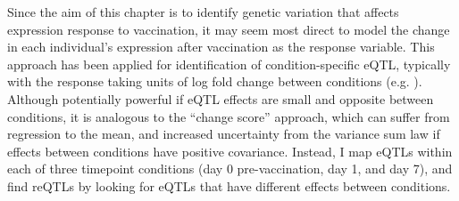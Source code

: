 Since the aim of this chapter is to identify genetic variation that affects expression response to vaccination, it may seem most direct to model the change in each individual's expression after vaccination as the response variable.
This approach has been applied for identification of condition-specific \gls{eQTL}, typically with the response taking units of log fold change between conditions (e.g. \autocite{maranville2011InteractionsGlucocorticoidTreatment,ackermann2013ImpactNaturalGenetic,shpak2014EQTLAnalysisHuman}).
Although potentially powerful if \gls{eQTL} effects are small and opposite between conditions\autocite{ackermann2013ImpactNaturalGenetic}, 
it is analogous to the \enquote{change score} approach, which can suffer from regression to the mean, and increased uncertainty from the variance sum law if effects between conditions have positive covariance\autocite{allison1990ChangeScoresDependent,clifton2019CorrelationBaselineScore}.
Instead, I map \glspl{eQTL} within each of three timepoint conditions (day 0 pre-vaccination, day 1, and day 7), and find \glspl{reQTL} by looking for \glspl{eQTL} that have different effects between conditions.

